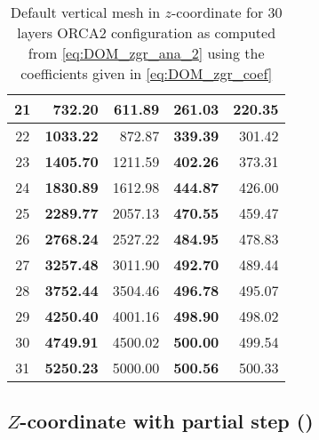 \documentclass[../main/NEMO_manual]{subfiles}
\begin{document}
\begin{table}
\begin{center}
\begin{tabular}{c||r|r|r|r}
      21	& 	\textbf{732.20}	& 	 611.89 & 	\textbf{261.03} & 	220.35 \\ \hline
      22	& 	\textbf{1033.22}&	 872.87 & 	\textbf{339.39} & 	301.42 \\ \hline
      23	& 	\textbf{1405.70}&	1211.59 & \textbf{402.26} & 	373.31 \\ \hline
      24	& 	\textbf{1830.89}&	1612.98 & \textbf{444.87} & 	426.00 \\ \hline
      25	& 	\textbf{2289.77}&	2057.13 & \textbf{470.55} & 	459.47 \\ \hline
      26	& 	\textbf{2768.24}&	2527.22 & \textbf{484.95} & 	478.83 \\ \hline
      27	& 	\textbf{3257.48}&	3011.90 & \textbf{492.70} & 	489.44 \\ \hline
      28	& 	\textbf{3752.44}&	3504.46 & \textbf{496.78} & 	495.07 \\ \hline
      29	& 	\textbf{4250.40}&	4001.16 & \textbf{498.90} & 	498.02 \\ \hline
      30	& 	\textbf{4749.91}&	4500.02 & \textbf{500.00} &	499.54 \\ \hline
      31	& 	\textbf{5250.23}&	5000.00 &	\textbf{500.56} &	500.33 \\ \hline
    \end{tabular}
  \end{center}
  \caption{
    \protect\label{tab:orca_zgr}
    Default vertical mesh in $z$-coordinate for 30 layers ORCA2 configuration as computed from
    \autoref{eq:DOM_zgr_ana_2} using the coefficients given in \autoref{eq:DOM_zgr_coef}
  }
\end{table}

\subsection{$Z$-coordinate with partial step (\protect{})}
\label{subsec:DOM_zps}

\end{document}
